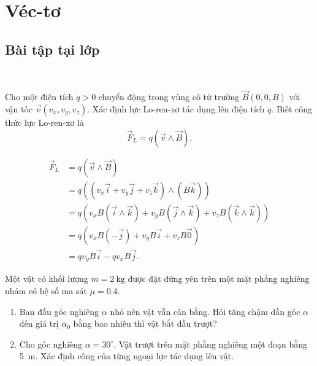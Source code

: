 \chapter*{Véc-tơ}

\section{Bài tập tại lớp}

\ 

\exercise Cho một điện tích $q > 0$ chuyển động trong vùng có từ trường $\vec{B}(0, 0, B)$ với vận tốc $\vec{v}(v_x, v_y, v_z)$. Xác định lực Lo-ren-xơ tác dụng lên điện tích $q$. Biết công thức lực Lo-ren-xơ là 
$$
\vec{F}_L = q(\vec{v} \wedge \vec{B}).
$$

\solution

\begin{align*}
   \vec{F}_L &= q(\vec{v} \wedge \vec{B}) \\
   &= q\left(\left(v_x \vec{i} + v_y \vec{j} + v_z \vec{k}\right) \wedge \left(B\vec{k}\right)\right) \\
   &= q\left(v_x B \left(\vec{i} \wedge \vec{k}\right) + v_y B \left(\vec{j} \wedge \vec{k}\right) + v_z B \left(\vec{k} \wedge \vec{k}\right)\right) \\
   &= q\left(v_x B \left(-\vec{j}\right) + v_y B \vec{i} + v_z B \vec{0}\right) \\
   &= q v_y B \vec{i} - q v_x B \vec{j}.
\end{align*}

\exercise Một vật có khối lượng $m = \qty{2}{\kg}$ được đặt đứng yên trên một mặt phẳng nghiêng nhám có hệ số ma sát $\mu = \num{0,4}$. 

\begin{enumerate}
   \item Ban đầu góc nghiêng $\alpha$ nhỏ nên vật vẫn cân bằng. Hỏi tăng chậm dần góc $\alpha$ đến giá trị $\alpha_0$ bằng bao nhiêu thì vật bắt đầu trượt?
   \item Cho góc nghiêng $\alpha = 30^\circ$. Vật trượt trên mặt phẳng nghiêng một đoạn bằng \qty{5}{m}. Xác định công của từng ngoại lực tác dụng lên vật.
\end{enumerate}

\solution

